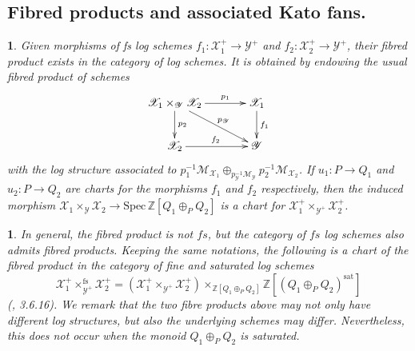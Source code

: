 \documentclass{amsart}%
\numberwithin{equation}{subsection}
\theoremstyle{plain2}
\theoremstyle{definition2}
\theoremstyle{stepstyle}
\theoremstyle{point}
\theoremstyle{subpoint}
\newtheorem{subpoint}[equation]{}%
\newcommand{\spa}[1]{\begin{subpoint}#1\end{subpoint}}           %
\newcommand{\Z}{\ensuremath{\mathbb{Z}}}
\newcommand{\cX}{\ensuremath{\mathscr{X}}}
\newcommand{\caM}{\ensuremath{\mathcal{M}}}
\newcommand{\cY}{\ensuremath{\mathscr{Y}}}
\renewcommand{\cY}{\ensuremath{\mathscr{Y}}}
\newcommand{\Spec}{\ensuremath{\mathrm{Spec}\,}}
\begin{document}
\subsection {Fibred products and associated Kato fans.}\label{sect fs product}
\spa{Given morphisms of \emph{fs} log schemes $f_1: \cX_1^+ \rightarrow \cY^+$ and $f_2: \cX_2^+ \rightarrow \cY^+$, their fibred product exists in the category of log schemes. It is obtained by endowing the usual fibred product of schemes
\begin{equation} \label{fibered product diagram}
\begin{gathered}
\xymatrixcolsep{3pc} \xymatrix{
  \cX_1\times_{\cY} \cX_2 \ar[r]^-{p_1} \ar[dr]^-{p_{\cY}} \ar[d]^-{p_2} & \cX_1 \ar[d]^{f_1}\\
  \cX_2 \ar[r]^{f_2}   & \cY
}
\end{gathered}
\end{equation}
with the log structure associated to $p_1^{-1}\caM_{\cX_1} \oplus_{p_{\cY}^{-1}\caM_{\cY}} p_2^{-1}\caM_{\cX_2}$. If $u_1:P \rightarrow Q_1$ and $u_2:P \rightarrow Q_2$ are charts for the morphisms $f_1$ and $f_2$ respectively, then the induced morphism $\cX_1\times_{\cY} \cX_2 \rightarrow \Spec \Z[Q_1 \oplus_P Q_2]$ is a chart for $\cX_1^+\times_{\cY^+} \cX_2^+$. }

\spa{In general, the fibred product is not $fs$, but the category of $fs$ log schemes also admits fibred products. Keeping the same notations, the following is a chart of the fibred product in the category of fine and saturated log schemes $$\cX_1^+\times_{\cY^+}^{\text{fs}} \cX_2^+ = (\cX_1^+\times_{\cY^+} \cX_2^+) \times_{\Z[Q_1 \oplus_P Q_2]} \Z[(Q_1 \oplus_P Q_2)^{\text{sat}}]$$(\cite{Bultot2015}, 3.6.16). We remark that the two fibre products above may not only have different log structures, but also the underlying schemes may differ. Nevertheless, this does not occur when the monoid $Q_1 \oplus_P Q_2$ is saturated.}
\end{document}
